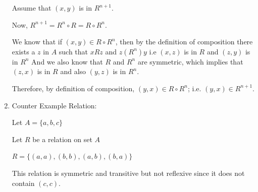 \documentclass{sig-alternate-05-2015}
\begin{document}
\begin{enumerate}
Assume that $(x,y)$ is in $R^{n+1}$.

Now, $R^{n+1}=R^n\circ R=R\circ R^n$.

We know that if $(x,y)\in R\circ R^n$, then by the definition of composition there
exists a $z$ in $A$ such that $xRz$ and $z(R^n)y$ i.e $(x,z)$ is in $R$ and $(z,y)$ is in $R
^n$ And we also know that $R$ and $R^n$ are symmetric, which implies that $(z,x)$ is
in $R$ and also $(y,z)$ is in $R^n$.

Therefore, by definition of composition, $(y,x)\in R\circ R^n$; i.e. $(y,x)\in R
^{n+1}$.

\item Counter Example Relation:

Let $A=\{a, b, c\}$

Let $R$ be a relation on set $A$

$R =\{(a, a), (b, b), (a, b), (b, a)\}$

This relation is symmetric and transitive but not reflexive since it does not
contain $(c,c)$.

\end{enumerate}
\end{document}
